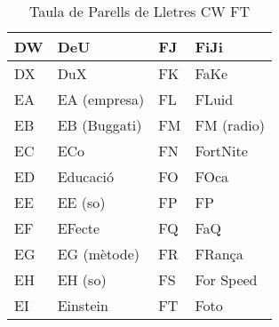 \begin{table}[h]
\begin{tabular}{llll}
    DW & DeU               & FJ & FiJi                  \\ \hline
    DX & DuX               & FK & FaKe                  \\ \hline
    EA & EA (empresa)      & FL & FLuid                 \\ \hline
    EB & EB (Buggati)      & FM & FM (radio)            \\ \hline
    EC & ECo               & FN & FortNite              \\ \hline
    ED & Educació          & FO & FOca                  \\ \hline
    EE & EE (so)           & FP & FP                    \\ \hline
    EF & EFecte            & FQ & FaQ                   \\ \hline
    EG & EG (mètode)       & FR & FRança                \\ \hline
    EH & EH (so)           & FS & For Speed             \\ \hline
    EI & Einstein          & FT & Foto                  \\ \hline  
    \end{tabular}
    \caption{Taula de Parells de Lletres CW \rightarrow FT}
    \label{tla:lletres-2}
    \end{table}


